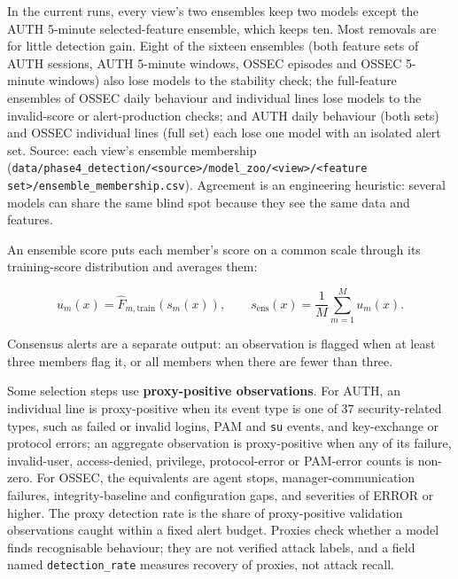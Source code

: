 \documentclass[11pt,a4paper]{article}
\newcommand{\projectref}[2]{#1 {\footnotesize(\nolinkurl{#2})}}
\begin{document}
In the current runs, every view's two ensembles keep two models except the AUTH 5-minute selected-feature ensemble, which keeps ten. Most removals are for little detection gain. Eight of the sixteen ensembles (both feature sets of AUTH sessions, AUTH 5-minute windows, OSSEC episodes and OSSEC 5-minute windows) also lose models to the stability check; the full-feature ensembles of OSSEC daily behaviour and individual lines lose models to the invalid-score or alert-production checks; and AUTH daily behaviour (both sets) and OSSEC individual lines (full set) each lose one model with an isolated alert set. Source: each view's \projectref{ensemble membership}{data/phase4_detection/<source>/model_zoo/<view>/<feature set>/ensemble_membership.csv}. Agreement is an engineering heuristic: several models can share the same blind spot because they see the same data and features.

An ensemble score puts each member's score on a common scale through its training-score distribution and averages them:

\begin{equation}
\label{eq:7}
u_m(x)=\widehat{F}_{m,\mathrm{train}}(s_m(x)),\qquad
s_{\mathrm{ens}}(x)=\frac{1}{M}\sum_{m=1}^{M}u_m(x).
\end{equation}

Consensus alerts are a separate output: an observation is flagged when at least three members flag it, or all members when there are fewer than three.

Some selection steps use \textbf{proxy-positive observations}. For AUTH, an individual line is proxy-positive when its event type is one of 37 security-related types, such as failed or invalid logins, PAM and \nolinkurl{su} events, and key-exchange or protocol errors; an aggregate observation is proxy-positive when any of its failure, invalid-user, access-denied, privilege, protocol-error or PAM-error counts is non-zero. For OSSEC, the equivalents are agent stops, manager-communication failures, integrity-baseline and configuration gaps, and severities of ERROR or higher. The proxy detection rate is the share of proxy-positive validation observations caught within a fixed alert budget. Proxies check whether a model finds recognisable behaviour; they are not verified attack labels, and a field named \nolinkurl{detection_rate} measures recovery of proxies, not attack recall.
\end{document}
